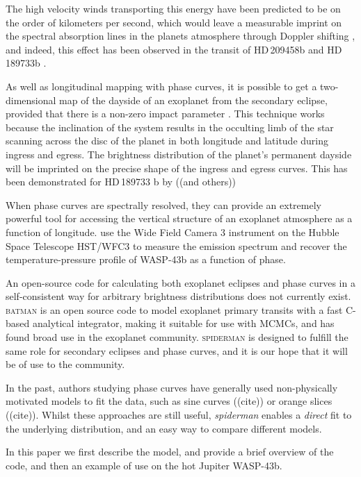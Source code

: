 \documentclass[a4paper,fleqn,usenatbib]{mnras}
\begin{document}
The high velocity winds transporting this energy have been predicted to be on the order of kilometers per second, which would leave a measurable imprint on the spectral absorption lines in the planets atmosphere through Doppler shifting \citep[e.g.][]{Showman2013}, and indeed, this effect has been observed in the transit of HD\,209458b \citep{Snellen2010} and HD\,189733b \citep{Louden2015}. 

As well as longitudinal mapping with phase curves, it is possible to get a two-dimensional map of the dayside of an exoplanet from the secondary eclipse, provided that there is a non-zero impact parameter \citep{Rauscher2006}. This technique works because the inclination of the system results in the occulting limb of the star scanning across the disc of the planet in both longitude and latitude during ingress and egress. The brightness distribution of the planet's permanent dayside will be imprinted on the precise shape of the ingress and egress curves. This has been demonstrated for HD\,189733 b by \citep{Majeau2012} ((and others))

When phase curves are spectrally resolved, they can provide an extremely powerful tool for accessing the vertical structure of an exoplanet atmosphere as a function of longitude. \citet{Stevenson2014} use the Wide Field Camera 3 instrument on the Hubble Space Telescope \textsc{HST}/WFC3 to measure the emission spectrum and recover the temperature-pressure profile of WASP-43b as a function of phase.


An open-source code for calculating both exoplanet eclipses and phase curves in a self-consistent way for arbitrary brightness distributions does not currently exist. \textsc{batman} \citep{Kreidberg2015a} is an open source code to model exoplanet primary transits with a fast C-based analytical integrator, making it suitable for use with MCMCs, and has found broad use in the exoplanet community. \textsc{spiderman} is designed to fulfill the same role for secondary eclipses and phase curves, and it is our hope that it will be of use to the community.

In the past, authors studying phase curves have generally used non-physically motivated models to fit the data, such as sine curves ((cite)) or orange slices ((cite)). Whilst these approaches are still useful, \emph{spiderman} enables a \emph{direct} fit to the underlying distribution, and an easy way to compare different models.

In this paper we first describe the model, and provide a brief overview of the code, and then an example of use on the hot Jupiter WASP-43b.
\end{document}
